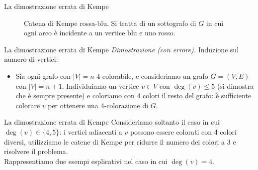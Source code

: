 \documentclass{beamer}
\begin{document}
	\begin{frame}{La dimostrazione errata di Kempe}
		\begin{figure}
			\centering
			\vspace{0.5cm}
			\caption{Catena di Kempe rossa-blu. Si tratta di un sottografo di $G$ in cui ogni arco è incidente a un vertice blu e uno rosso.}
		\end{figure}
	\end{frame}
	  
	\begin{frame}{La dimostrazione errata di Kempe}
		\emph{Dimostrazione (con errore).} Induzione sul numero di vertici:
		\begin{itemize}
			\item Sia ogni grafo con $\lvert V \rvert = n$ 4-colorabile, e consideriamo un grafo $G = (V, E)$ con $\lvert V \rvert = n + 1$. Individuiamo un vertice $v \in V$ con $\deg(v) \leq 5$ (si dimostra che è sempre presente) e coloriamo con 4 colori il resto del grafo: è sufficiente colorare $v$ per ottenere una 4-colorazione di $G$.
		\end{itemize}
	\end{frame}
	
	\begin{frame}{La dimostrazione errata di Kempe}
		Consideriamo soltanto il caso in cui $\deg(v) \in \{4, 5\}$: i vertici adiacenti a $v$ possono essere colorati con 4 colori diversi, utilizziamo le catene di Kempe per ridurre il numero dei colori a 3 e risolvere il problema.
		\\Rappresentiamo due esempi esplicativi nel caso in cui $\deg(v) = 4$.
	\end{frame}
	
\end{document}
